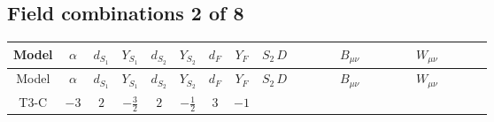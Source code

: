\documentclass[8pt]{article}
\begin{document}
\begin{landscape}
\subsection*{Field combinations 2 of 8}
\begin{longtable}{@{}cccccccc >{\raggedright\arraybackslash}p{0.21\linewidth} >{\raggedright\arraybackslash}p{0.21\linewidth} >{\raggedright\arraybackslash}p{0.21\linewidth}@{}}
\toprule
Model & $\alpha$ & $d_{S_1}$ & $Y_{S_1}$ & $d_{S_2}$ & $Y_{S_2}$ & $d_F$ & $Y_F$ & $S_2\,D$ & $B_{\mu\nu}$ & $W_{\mu\nu}$ \\
\midrule
\endfirsthead
\toprule
Model & $\alpha$ & $d_{S_1}$ & $Y_{S_1}$ & $d_{S_2}$ & $Y_{S_2}$ & $d_F$ & $Y_F$ & $S_2\,D$ & $B_{\mu\nu}$ & $W_{\mu\nu}$ \\
\midrule
\endhead
T3-C & $-3$ & $2$ & $-\frac{3}{2}$ & $2$ & $-\frac{1}{2}$ & $3$ & $-1$ & \scriptsize\adjustbox{max width=\linewidth}{$\begin{gathered} +D_{\mu _1}\left(S_{2,j_1}\right){}^{\dagger } D_{\mu _1}\left(S_{2,j_1}\right)\end{gathered}$} & \scriptsize\adjustbox{max width=\linewidth}{$\begin{gathered} -\frac{3 \hbar  B_{\mu _1\mu _2}^2}{\epsilon }\end{gathered}$} & \scriptsize\adjustbox{max width=\linewidth}{$\begin{gathered} -\frac{2 \hbar  \left(W_{\mu _1\mu _2}^{A_1}\right){}^2}{\epsilon }\end{gathered}$} \\
\midrule
\bottomrule
\end{longtable}
\clearpage

\end{landscape}
\end{document}
